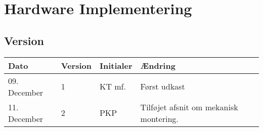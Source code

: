 \chapter{Hardware Implementering}\label{ch:hwimpl}
\section*{Version}
\begin{table}[h]
	\centering
	\begin{tabularx}{\textwidth - 2cm}{|l|l|l|X|}
	\hline
	Dato			& Version			& Initialer 		& Ændring										\\ \hline
	09. December	& 1 				& KT mf.	 		& Først udkast			\\ \hline
	11. December	& 2 				& PKP		 		& Tilføjet afsnit om mekanisk montering.	\\\hline
	\end{tabularx}
\end{table}
\clearpage


\clearpage

\clearpage

\clearpage

\clearpage

\clearpage